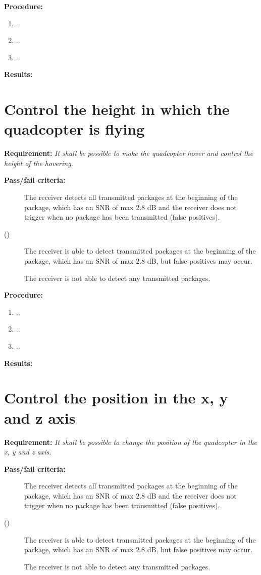 \textbf{Procedure:}\\


\begin{enumerate}
	\item ..
	\item ..
	\item ..
\end{enumerate} 


\textbf{Results:}


\newpage

\section{Control the height in which the quadcopter is flying}
\textbf{Requirement:}
\textit{It shall be possible to make the quadcopter hover and control the height of the hovering.}

\textbf{Pass/fail criteria:}
	\begin{description}
	\item[  ] The receiver detects all transmitted packages at the beginning of the package, which has an SNR of max 2.8 dB and the receiver does not trigger when no package has been transmitted (false positives).
	\item[()]The receiver is able to detect transmitted packages at the beginning of the package, which has an SNR of max 2.8 dB, but false positives may occur.
	\item[  \phantom{)}]The receiver is not able to detect any transmitted packages.
	\end{description}

		
\textbf{Procedure:}\\


\begin{enumerate}
	\item ..
	\item ..
	\item ..
\end{enumerate} 


\textbf{Results:}


\newpage

\section{Control the position in the x, y and z axis}
\textbf{Requirement:}
\textit{It shall be possible to change the position of the quadcopter in the x, y and z axis.}

\textbf{Pass/fail criteria:}
	\begin{description}
	\item[  ] The receiver detects all transmitted packages at the beginning of the package, which has an SNR of max 2.8 dB and the receiver does not trigger when no package has been transmitted (false positives).
	\item[()]The receiver is able to detect transmitted packages at the beginning of the package, which has an SNR of max 2.8 dB, but false positives may occur.
	\item[  \phantom{)}]The receiver is not able to detect any transmitted packages.
	\end{description}

